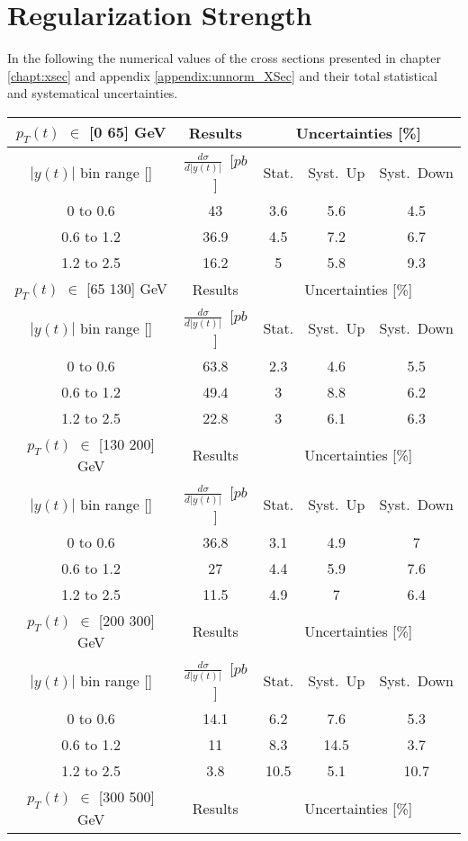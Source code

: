 \chapter{Regularization Strength}\label{appendix:xsec_table}

In the following the numerical values of the cross sections presented in chapter \ref{chapt:xsec} and 
appendix \ref{appendix:unnorm_XSec} and their total statistical and systematical uncertainties.

\begin{table}[h]
\begin{tabular}{|c|c|c|c|c|}
\hline
$p_{T}(t)$ $\in$ [0 65] GeV & Results &\multicolumn{3}{c|}{Uncertainties [\%] }  \\ 
\hline
$|y(t)|$ bin range []&$\frac{d\sigma}{d|y(t)|}$~[$pb$]&Stat.&Syst.~Up&Syst.~Down \\ 
\hline
0 to 0.6&43&3.6&5.6&4.5 \\ 
0.6 to 1.2&36.9&4.5&7.2&6.7 \\ 
1.2 to 2.5&16.2&5&5.8&9.3 \\ 
\hline
\hline
$p_{T}(t)$ $\in$ [65 130] GeV & Results &\multicolumn{3}{c|}{Uncertainties [\%] }  \\ 
\hline
$|y(t)|$ bin range []&$\frac{d\sigma}{d|y(t)|}$~[$pb$]&Stat.&Syst.~Up&Syst.~Down \\ 
\hline
0 to 0.6&63.8&2.3&4.6&5.5 \\ 
0.6 to 1.2&49.4&3&8.8&6.2 \\ 
1.2 to 2.5&22.8&3&6.1&6.3 \\ 
\hline
\hline
$p_{T}(t)$ $\in$ [130 200] GeV & Results &\multicolumn{3}{c|}{Uncertainties [\%] }  \\ 
\hline
$|y(t)|$ bin range []&$\frac{d\sigma}{d|y(t)|}$~[$pb$]&Stat.&Syst.~Up&Syst.~Down \\ 
\hline
0 to 0.6&36.8&3.1&4.9&7 \\ 
0.6 to 1.2&27&4.4&5.9&7.6 \\ 
1.2 to 2.5&11.5&4.9&7&6.4 \\ 
\hline
\hline
$p_{T}(t)$ $\in$ [200 300] GeV & Results &\multicolumn{3}{c|}{Uncertainties [\%] }  \\ 
\hline
$|y(t)|$ bin range []&$\frac{d\sigma}{d|y(t)|}$~[$pb$]&Stat.&Syst.~Up&Syst.~Down \\ 
\hline
0 to 0.6&14.1&6.2&7.6&5.3 \\ 
0.6 to 1.2&11&8.3&14.5&3.7 \\ 
1.2 to 2.5&3.8&10.5&5.1&10.7 \\ 
\hline
\hline
$p_{T}(t)$ $\in$ [300 500] GeV & Results &\multicolumn{3}{c|}{Uncertainties [\%] }  \\ 

\end{tabular}
\end{table}

